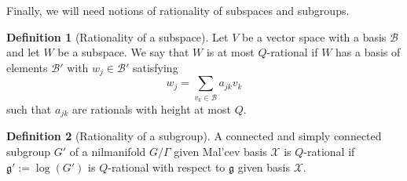 \documentclass[11pt, a4paper]{amsart}
\newcommand{\mc}[1]{\mathcal{#1}}
\theoremstyle{plain}
\theoremstyle{plain}
\theoremstyle{definition}
\newtheorem{definition}{Definition}
\theoremstyle{remark}
\numberwithin{equation}{section}
\numberwithin{lemma}{section}
\numberwithin{proposition}{section}
\numberwithin{corollary}{section}
\numberwithin{definition}{section}
\numberwithin{claim}{section}
\begin{document}
Finally, we will need notions of rationality of subspaces and subgroups.
\begin{definition}[Rationality of a subspace]
Let $V$ be a vector space with a basis $\mc{B}$ and let $W$ be a subspace. We say that $W$ is at most $Q$-rational if $W$ has a basis of elements $\mc{B}'$ with $w_j\in \mc{B}'$ satisfying
\[w_j = \sum_{v_k\in \mc{B}} a_{jk} v_k\]
such that $a_{jk}$ are rationals with height at most $Q$.
\end{definition}
\begin{definition}[Rationality of a subgroup]
A connected and simply connected subgroup $G'$ of a nilmanifold $G/\Gamma$ given Mal'cev basis $\mc{X}$ is $Q$-rational if $\mathfrak{g}' := \log(G')$ is $Q$-rational with respect to $\mathfrak{g}$ given basis $\mc{X}$.
\end{definition}
\end{document}
